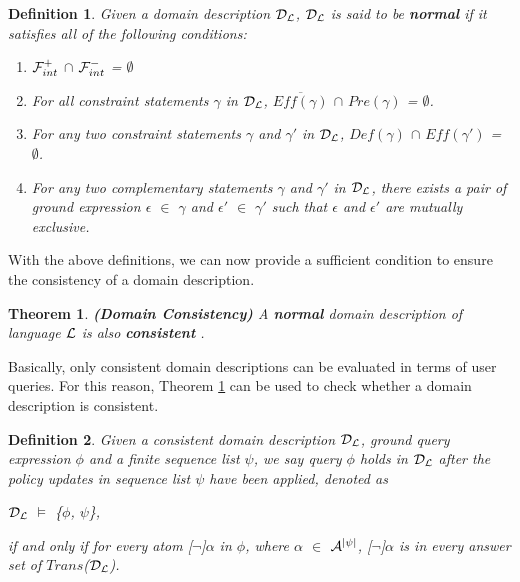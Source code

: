 \documentclass[11pt, twocolumn]{article}
\newtheorem{vtheorm}{Theorem}
\newtheorem{vdefinition}{Definition}
\newenvironment{vtheorem}[1]
  {\begin{vtheorm}{\bf (#1)\hspace{0.5em}}}
  {\end{vtheorm}}
\newenvironment{vquote}
  {\begin{list}{}{\leftmargin 1em}\item[]}
  {\end{list}}
\begin{document}
    \begin{vdefinition}
      \label{def-norm}
      Given a domain description ${\cal D_{L}}$, ${\cal D_{L}}$ is said to
      be {\bf normal} if it satisfies all of the following conditions:
      \begin{enumerate}
        \item
          ${\cal F}^{+}_{int}$ $\cap$ ${\cal F}^{-}_{int}$ = $\emptyset$
        \item
          For all constraint statements $\gamma$ in ${\cal D_{L}}$,
          $\overline{Eff(\gamma)}$ $\cap$ $Pre(\gamma)$ = $\emptyset$.
        \item
          For any two constraint statements $\gamma$ and $\gamma'$ in
          ${\cal D_{L}}$, $Def(\gamma)$ $\cap$ $Eff(\gamma')$ =
          $\emptyset$.
        \item
          For any two complementary statements $\gamma$ and $\gamma'$ in
          ${\cal D_{L}}$, there exists a pair of ground expression $\epsilon$
          $\in$ $\gamma$ and $\epsilon'$ $\in$ $\gamma'$ such that $\epsilon$ and
          $\epsilon'$ are mutually exclusive.
      \end{enumerate}
    \end{vdefinition}

    With the above definitions, we can now provide a sufficient condition to
    ensure the consistency of a domain description.

    \begin{vtheorem}{Domain Consistency}
      \label{the-cons}
      A {\bf normal} domain description of language ${\cal L}$ is also
      {\bf consistent} \footnotemark.
    \end{vtheorem}


    Basically, only consistent domain descriptions can be evaluated in terms
    of user queries. For this reason, Theorem \ref{the-cons} can be used to
    check whether a domain description is consistent.

    \begin{vdefinition}
      \label{def-eval}
      Given a consistent domain description ${\cal D}_{\cal L}$, ground
      query expression $\phi$ and a finite sequence list $\psi$, we say
      {\em query $\phi$ holds in ${\cal D}_{\cal L}$ after the policy updates
      in sequence list $\psi$ have been applied}, denoted as

      \begin{vquote}
        ${\cal D}_{\cal L}$ $\models$ \{$\phi$, $\psi$\},
      \end{vquote}

      \noindent if and only if for every atom [$\lnot$]$\alpha$ in $\phi$,
      where $\alpha$ $\in$ ${\cal A}^{|\psi|}$, [$\lnot$]$\alpha$ is in
      every answer set of $Trans$(${\cal D}_{\cal L}$).
    \end{vdefinition}
\end{document}
